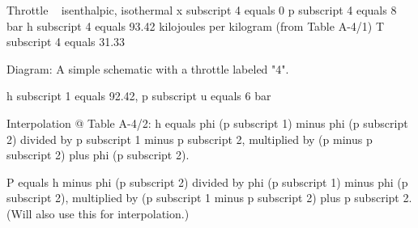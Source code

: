 Throttle ~ isenthalpic, isothermal  
x subscript 4 equals 0  
p subscript 4 equals 8 bar  
h subscript 4 equals 93.42 kilojoules per kilogram (from Table A-4/1)  
T subscript 4 equals 31.33  

Diagram: A simple schematic with a throttle labeled "4".  

h subscript 1 equals 92.42, p subscript u equals 6 bar  

Interpolation @ Table A-4/2:  
h equals phi (p subscript 1) minus phi (p subscript 2) divided by p subscript 1 minus p subscript 2, multiplied by (p minus p subscript 2) plus phi (p subscript 2).  

P equals h minus phi (p subscript 2) divided by phi (p subscript 1) minus phi (p subscript 2), multiplied by (p subscript 1 minus p subscript 2) plus p subscript 2.  
(Will also use this for interpolation.)